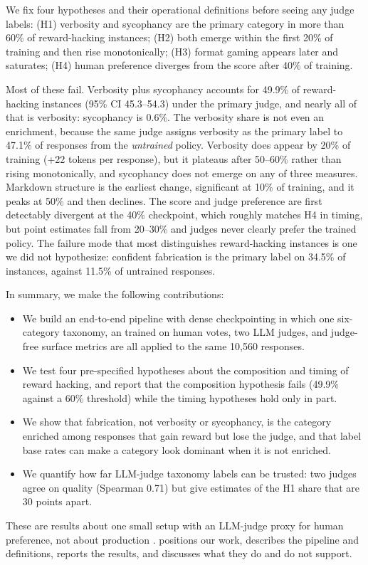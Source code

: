 We fix four hypotheses and their operational definitions before seeing any judge labels:
(H1) verbosity and sycophancy are the primary category in more than 60\% of reward-hacking instances;
(H2) both emerge within the first 20\% of training and then rise monotonically;
(H3) format gaming appears later and saturates;
(H4) human preference diverges from the \rmodel score after 40\% of training.

Most of these fail.
Verbosity plus sycophancy accounts for 49.9\% of reward-hacking instances (95\% CI 45.3--54.3) under the primary judge, and nearly all of that is verbosity: sycophancy is 0.6\%.
The verbosity share is not even an enrichment, because the same judge assigns verbosity as the primary label to 47.1\% of responses from the \emph{untrained} policy.
Verbosity does appear by 20\% of training (+22 tokens per response), but it plateaus after 50--60\% rather than rising monotonically, and sycophancy does not emerge on any of three measures.
Markdown structure is the earliest change, significant at 10\% of training, and it peaks at 50\% and then declines.
The \rmodel score and judge preference are first detectably divergent at the 40\% checkpoint, which roughly matches H4 in timing, but point estimates fall from 20--30\% and judges never clearly prefer the trained policy.
The failure mode that most distinguishes reward-hacking instances is one we did not hypothesize: confident fabrication is the primary label on 34.5\% of instances, against 11.5\% of untrained responses.

In summary, we make the following contributions:
\begin{itemize}[leftmargin=*,itemsep=0pt,topsep=0pt]
    \item We build an end-to-end \rlhf pipeline with dense checkpointing in which one six-category taxonomy, an \rmodel trained on human votes, two LLM judges, and judge-free surface metrics are all applied to the same 10,560 responses.
    \item We test four pre-specified hypotheses about the composition and timing of reward hacking, and report that the composition hypothesis fails (49.9\% against a 60\% threshold) while the timing hypotheses hold only in part.
    \item We show that fabrication, not verbosity or sycophancy, is the category enriched among responses that gain reward but lose the judge, and that label base rates can make a category look dominant when it is not enriched.
    \item We quantify how far LLM-judge taxonomy labels can be trusted: two judges agree on quality (Spearman 0.71) but give estimates of the H1 share that are 30 points apart.
\end{itemize}

These are results about one small \rlhf setup with an LLM-judge proxy for human preference, not about production \rlhf.
 positions our work,  describes the pipeline and definitions,  reports the results, and  discusses what they do and do not support.
